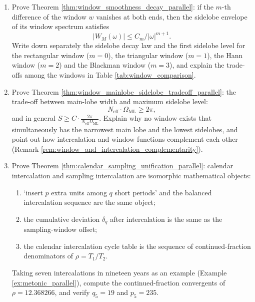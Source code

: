 \begin{enumerate}[leftmargin=3em, label=\textbf{Exercise \arabic*}]
    \item Prove Theorem \ref{thm:window_smoothness_decay_parallel}:
    if the $m$-th difference of the window $w$ vanishes at both ends, then the sidelobe envelope of its window spectrum satisfies
    \[
    |W_M(\omega)|\le C_m/|\omega|^{m+1}.
    \]
    Write down separately the sidelobe decay law and the first sidelobe level for the rectangular window ($m=0$), the triangular window ($m=1$), the Hann window ($m=2$)
    and the Blackman window ($m=3$),
    and explain the trade-offs among the windows in Table \ref{tab:window_comparison}.

    \item Prove Theorem \ref{thm:window_mainlobe_sidelobe_tradeoff_parallel}:
    the trade-off between main-lobe width and maximum sidelobe level:
    \[
    N_{\mathrm{eff}}\cdot\Omega_{\mathrm{ML}}\ge2\pi,
    \]
    and in general $S\ge C\cdot\frac{2\pi}{N_{\mathrm{eff}}\Omega_{\mathrm{ML}}}$.
    Explain why no window exists that simultaneously has the narrowest main lobe and the lowest sidelobes,
    and point out how intercalation and window functions complement each other (Remark \ref{rem:window_and_intercalation_complementarity}).

    \item Prove Theorem \ref{thm:calendar_sampling_unification_parallel}:
    calendar intercalation and sampling intercalation are isomorphic mathematical objects:
    \begin{enumerate}[label=(\roman*)]
        \item `insert $p$ extra units among $q$ short periods' and the balanced intercalation sequence are the same object;
        \item the cumulative deviation $\delta_q$ after intercalation is the same as the sampling-window offset;
        \item the calendar intercalation cycle table is the sequence of continued-fraction denominators of $\rho=T_1/T_2$.
    \end{enumerate}
    Taking seven intercalations in nineteen years as an example (Example \ref{ex:metonic_parallel}),
    compute the continued-fraction convergents of $\rho=12.368266$,
    and verify $q_5=19$ and $p_5=235$.


\end{enumerate}
